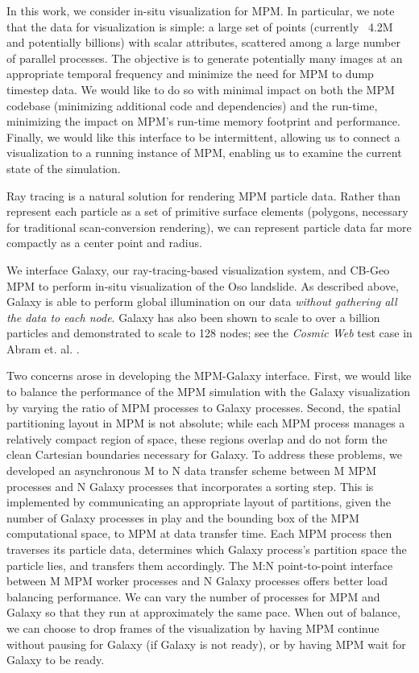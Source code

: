 \documentclass[journal]{IEEEtran}
\begin{document}
In this work, we consider in-situ visualization for MPM. In particular, we note that the data for visualization is simple: a large set of points (currently ~4.2M and potentially billions) with scalar attributes, scattered among a large number of parallel processes.  The objective is to generate potentially many images at an appropriate temporal frequency and minimize the need for MPM to dump timestep data.  We would like to do so with minimal impact on both the MPM codebase (minimizing additional code and dependencies) and the run-time, minimizing the impact on MPM's run-time memory footprint and performance.  Finally, we would like this interface to be intermittent, allowing us to connect a visualization to a running instance of MPM, enabling us to examine the current state of the simulation.

Ray tracing is a natural solution for rendering MPM particle data.  Rather than represent each particle as a set of primitive surface elements (polygons, necessary for traditional scan-conversion rendering), we can represent particle data far more compactly as a center point and radius.  

We interface Galaxy, our ray-tracing-based visualization system, and CB-Geo MPM to perform in-situ visualization of the Oso landslide.  As described above, Galaxy is able to perform global illumination on our data \textit{without gathering all the data to each node}.  Galaxy has also been shown to scale to over a billion particles and demonstrated to scale to 128 nodes; see the \textit{Cosmic Web} test case in Abram et. al. \cite{abram2018galaxy}.  

Two concerns arose in developing the MPM-Galaxy interface.   First, we would like to balance the performance of the MPM simulation with the Galaxy visualization by varying the ratio of MPM processes to Galaxy processes.   Second, the spatial partitioning layout in MPM is not absolute; while each MPM process manages a relatively compact region of space, these regions overlap and do not form the clean Cartesian boundaries necessary for Galaxy.   To address these problems, we developed an asynchronous M to N data transfer scheme between M MPM processes and N Galaxy processes that incorporates a sorting step.   This is implemented by communicating an appropriate layout of partitions, given the number of Galaxy processes in play and the bounding box of the MPM computational space, to MPM at data transfer time.   Each MPM process then traverses its particle data, determines which Galaxy process's partition space the particle lies, and transfers them accordingly.  The M:N point-to-point interface between M MPM worker processes and N Galaxy processes offers better load balancing performance.  We can vary the number of processes for MPM and Galaxy so that they run at approximately the same pace.  When out of balance, we can
choose to drop frames of the visualization by having MPM
continue without pausing for Galaxy (if Galaxy is not ready), or by having MPM wait for Galaxy to be ready.
\end{document}
